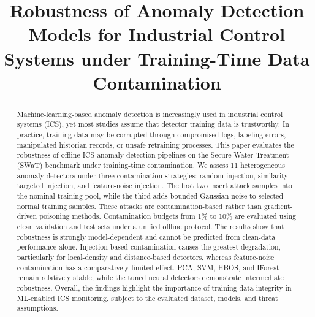 \documentclass[10pt,conference]{IEEEtran}
\begin{document}
\title{Robustness of Anomaly Detection Models for Industrial Control Systems under Training-Time Data Contamination}


\author{
}

\maketitle

\begin{abstract}
Machine-learning-based anomaly detection is increasingly used in industrial control systems (ICS), yet most studies assume that detector training data is trustworthy. In practice, training data may be corrupted through compromised logs, labeling errors, manipulated historian records, or unsafe retraining processes. This paper evaluates the robustness of offline ICS anomaly-detection pipelines on the Secure Water Treatment (SWaT) benchmark under training-time contamination. We assess 11 heterogeneous anomaly detectors under three contamination strategies: random injection, similarity-targeted injection, and feature-noise injection. The first two insert attack samples into the nominal training pool, while the third adds bounded Gaussian noise to selected normal training samples. These attacks are contamination-based rather than gradient-driven poisoning methods. Contamination budgets from 1\% to 10\% are evaluated using clean validation and test sets under a unified offline protocol. The results show that robustness is strongly model-dependent and cannot be predicted from clean-data performance alone. Injection-based contamination causes the greatest degradation, particularly for local-density and distance-based detectors, whereas feature-noise contamination has a comparatively limited effect. PCA, SVM, HBOS, and IForest remain relatively stable, while the tuned neural detectors demonstrate intermediate robustness. Overall, the findings highlight the importance of training-data integrity in ML-enabled ICS monitoring, subject to the evaluated dataset, models, and threat assumptions.
\end{abstract}
\end{document}
